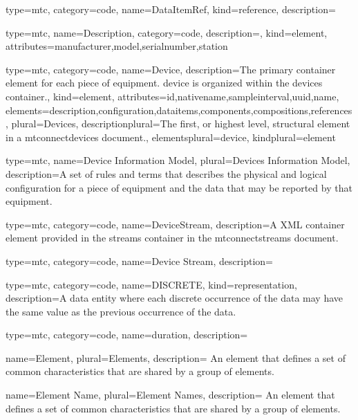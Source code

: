 {
  type=mtc,
  category=code,
  name={DataItemRef},
  kind={reference},
  description={}
}


{
  type=mtc,
  name={Description},
  category=code,
  description={},
  kind={element},
  attributes={\gls{manufacturer},\gls{model},\gls{serialnumber},\gls{station}}
}


{
  type=mtc,
  category=code,
  name={Device},
  description={The primary container element for each piece of equipment. \gls{device} is organized within the \glspl{device}  container.},
  kind={element},
  attributes={\gls{id},\gls{nativename},\gls{sampleinterval},\gls{uuid},\gls{name}},
  elements={\gls{description},\gls{configuration},\glspl{dataitem},\glspl{component},\glspl{composition},\glspl{reference}},
  plural={Devices},
  descriptionplural={The first, or highest level, \gls{structural element} in a \glspl{mtconnectdevice} document.},
  elementsplural={\gls{device}},
  kindplural={element}
}


{
  type=mtc,
  name={Device Information Model},
  plural={Devices Information Model},
  description={A set of rules and terms that describes the physical and logical configuration for a piece of equipment and the data that may be reported by that equipment.}
}


{
  type=mtc,
  category=code,
  name={DeviceStream},
  description={A XML container element provided in the \glspl{stream} container in the \glspl{mtconnectstream} document.}
}


{
  type=mtc,
  category=code,
  name={Device Stream},
  description={}
}


{
  type=mtc,
  category=code,
  name={DISCRETE},
  kind={representation},
  description={A \gls{data entity} where each discrete occurrence of the data may have the same value as the previous occurrence of the data.}
}


{
  type=mtc,
  category=code,
  name={duration},
  description={}
}


{
  name={Element},
  plural={Elements},
  description= {An element that defines a set of common characteristics that are shared by a group of elements.}
}


{
  name={Element Name},
  plural={Element Names},
  description= {An element that defines a set of common characteristics that are shared by a group of elements.}
}


